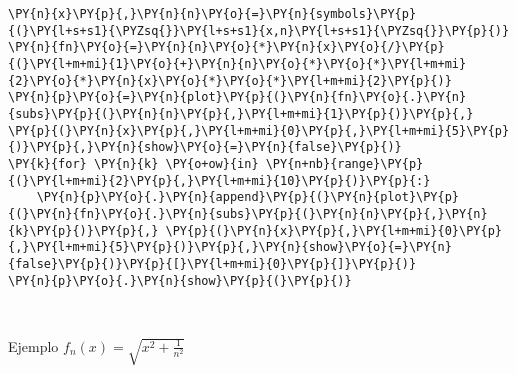     \begin{tcolorbox}[breakable, size=fbox, boxrule=1pt, pad at break*=1mm,colback=cellbackground, colframe=cellborder]
\begin{Verbatim}[commandchars=\\\{\}]
\PY{n}{x}\PY{p}{,}\PY{n}{n}\PY{o}{=}\PY{n}{symbols}\PY{p}{(}\PY{l+s+s1}{\PYZsq{}}\PY{l+s+s1}{x,n}\PY{l+s+s1}{\PYZsq{}}\PY{p}{)}
\PY{n}{fn}\PY{o}{=}\PY{n}{n}\PY{o}{*}\PY{n}{x}\PY{o}{/}\PY{p}{(}\PY{l+m+mi}{1}\PY{o}{+}\PY{n}{n}\PY{o}{*}\PY{o}{*}\PY{l+m+mi}{2}\PY{o}{*}\PY{n}{x}\PY{o}{*}\PY{o}{*}\PY{l+m+mi}{2}\PY{p}{)}
\PY{n}{p}\PY{o}{=}\PY{n}{plot}\PY{p}{(}\PY{n}{fn}\PY{o}{.}\PY{n}{subs}\PY{p}{(}\PY{n}{n}\PY{p}{,}\PY{l+m+mi}{1}\PY{p}{)}\PY{p}{,} \PY{p}{(}\PY{n}{x}\PY{p}{,}\PY{l+m+mi}{0}\PY{p}{,}\PY{l+m+mi}{5}\PY{p}{)}\PY{p}{,}\PY{n}{show}\PY{o}{=}\PY{n}{false}\PY{p}{)}
\PY{k}{for} \PY{n}{k} \PY{o+ow}{in} \PY{n+nb}{range}\PY{p}{(}\PY{l+m+mi}{2}\PY{p}{,}\PY{l+m+mi}{10}\PY{p}{)}\PY{p}{:}
    \PY{n}{p}\PY{o}{.}\PY{n}{append}\PY{p}{(}\PY{n}{plot}\PY{p}{(}\PY{n}{fn}\PY{o}{.}\PY{n}{subs}\PY{p}{(}\PY{n}{n}\PY{p}{,}\PY{n}{k}\PY{p}{)}\PY{p}{,} \PY{p}{(}\PY{n}{x}\PY{p}{,}\PY{l+m+mi}{0}\PY{p}{,}\PY{l+m+mi}{5}\PY{p}{)}\PY{p}{,}\PY{n}{show}\PY{o}{=}\PY{n}{false}\PY{p}{)}\PY{p}{[}\PY{l+m+mi}{0}\PY{p}{]}\PY{p}{)}
\PY{n}{p}\PY{o}{.}\PY{n}{show}\PY{p}{(}\PY{p}{)}
\end{Verbatim}
\end{tcolorbox}

    \begin{center}
    \end{center}
    { \hspace*{\fill} \\}
    
    Ejemplo \(f_n(x)=\sqrt{x^2+\frac{1}{n^2}}\)

